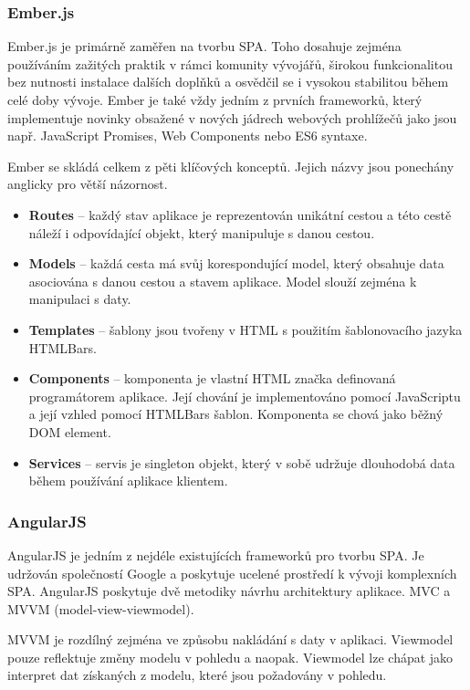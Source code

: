 \subsubsection*{Ember.js}

Ember.js je primárně zaměřen na tvorbu SPA. Toho dosahuje zejména používáním zažitých praktik v rámci komunity vývojářů, širokou funkcionalitou bez nutnosti instalace dalších doplňků a osvědčil se i vysokou stabilitou během celé doby vývoje. Ember je také vždy jedním z prvních frameworků, který implementuje novinky obsažené v nových jádrech webových prohlížečů jako jsou např. JavaScript Promises\cite{jspromises}, Web Components\cite{webcomponents} nebo ES6 syntaxe.

Ember se skládá celkem z pěti klíčových konceptů. Jejich názvy jsou ponechány anglicky pro větší názornost.

\begin{itemize}  
    \item {\bf Routes} -- každý stav aplikace je reprezentován unikátní cestou a této cestě náleží i odpovídající objekt, který manipuluje s danou cestou.
    \item {\bf Models} -- každá cesta má svůj korespondující model, který obsahuje data asociována s danou cestou a stavem aplikace. Model slouží zejména k manipulaci s daty.
    \item {\bf Templates} -- šablony jsou tvořeny v HTML s použitím šablonovacího jazyka HTMLBars\cite{htmlbars}.
    \item {\bf Components} -- komponenta je vlastní HTML značka definovaná programátorem aplikace. Její chování je implementováno pomocí JavaScriptu a její vzhled pomocí HTMLBars šablon. Komponenta se chová jako běžný DOM element.
    \item {\bf Services} -- servis je singleton objekt, který v sobě udržuje dlouhodobá data během používání aplikace klientem.
\end{itemize}

\subsubsection*{AngularJS}

AngularJS je jedním z nejdéle existujících frameworků pro tvorbu SPA. Je udržován společností Google a poskytuje ucelené prostředí k vývoji komplexních SPA. AngularJS poskytuje dvě metodiky návrhu architektury aplikace. MVC a MVVM (model-view-viewmodel)\cite{mvvm}.

MVVM je rozdílný zejména ve způsobu nakládání s daty v aplikaci. Viewmodel pouze reflektuje změny modelu v pohledu a naopak. Viewmodel lze chápat jako interpret dat získaných z modelu, které jsou požadovány v pohledu.

